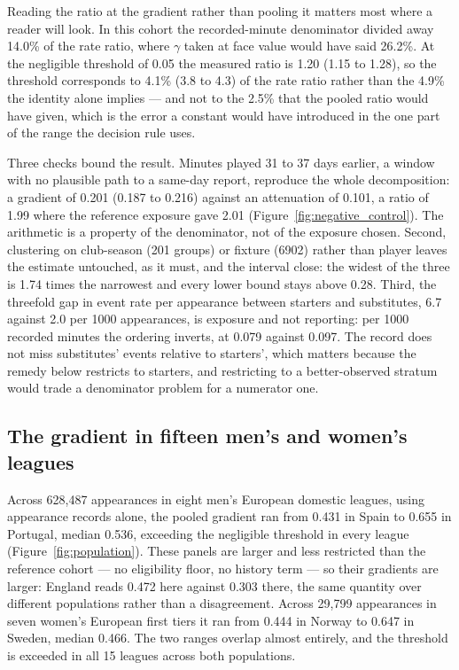 \documentclass[11pt]{article}
\begin{document}
Reading the ratio at the gradient rather than pooling it matters most where a reader will look. In this cohort the recorded-minute denominator divided away 14.0\% of the rate ratio, where $\gamma$ taken at face value would have said 26.2\%. At the negligible threshold of 0.05 the measured ratio is 1.20 (1.15 to 1.28), so the threshold corresponds to 4.1\% (3.8 to 4.3) of the rate ratio rather than the 4.9\% the identity alone implies --- and not to the 2.5\% that the pooled ratio would have given, which is the error a constant would have introduced in the one part of the range the decision rule uses.

Three checks bound the result. Minutes played 31 to 37 days earlier, a window with no plausible path to a same-day report, reproduce the whole decomposition: a gradient of 0.201 (0.187 to 0.216) against an attenuation of 0.101, a ratio of 1.99 where the reference exposure gave 2.01 (Figure~\ref{fig:negative_control}). The arithmetic is a property of the denominator, not of the exposure chosen. Second, clustering on club-season (201 groups) or fixture (6902) rather than player leaves the estimate untouched, as it must, and the interval close: the widest of the three is 1.74 times the narrowest and every lower bound stays above 0.28. Third, the threefold gap in event rate per appearance between starters and substitutes, 6.7 against 2.0 per 1000 appearances, is exposure and not reporting: per 1000 recorded minutes the ordering inverts, at 0.079 against 0.097. The record does not miss substitutes' events relative to starters', which matters because the remedy below restricts to starters, and restricting to a better-observed stratum would trade a denominator problem for a numerator one.

\subsection{The gradient in fifteen men's and women's leagues}

Across 628,487 appearances in eight men's European domestic leagues, using appearance records alone, the pooled gradient ran from 0.431 in Spain to 0.655 in Portugal, median 0.536, exceeding the negligible threshold in every league (Figure~\ref{fig:population}). These panels are larger and less restricted than the reference cohort --- no eligibility floor, no history term --- so their gradients are larger: England reads 0.472 here against 0.303 there, the same quantity over different populations rather than a disagreement. Across 29,799 appearances in seven women's European first tiers it ran from 0.444 in Norway to 0.647 in Sweden, median 0.466. The two ranges overlap almost entirely, and the threshold is exceeded in all 15 leagues across both populations.
\end{document}
